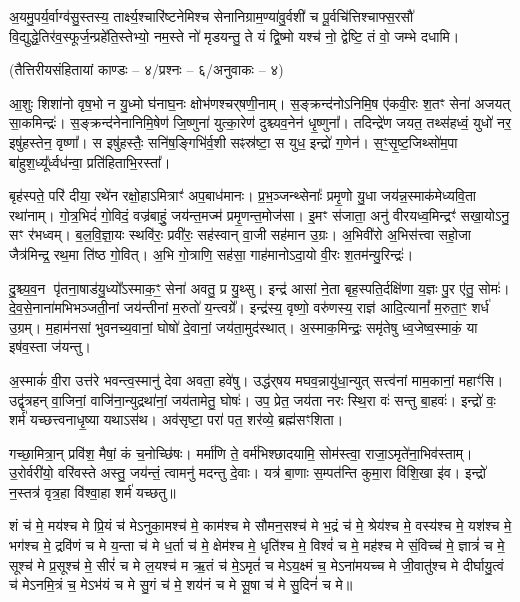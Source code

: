 अ॒यमु॒पर्य॒र्वाग्व॑सु॒स्तस्य॒ तार्क्ष्य॒श्चारि॑ष्टनेमिश्च  सेनानि\-ग्राम॒ण्या॑वु॒र्वशी॑ च
पू॒र्वचि॑त्तिश्चाफ्स॒रसौ॑ वि॒द्युद्धे॒तिर॑व॒\-स्फूर्ज॒न्प्रहे॑ति॒स्तेभ्यो॒
नम॒स्ते नो॑ मृडयन्तु॒ ते यं द्वि॒ष्मो यश्च॑ नो॒ द्वेष्टि॒ तं वो॒  जम्भे दधामि।


\centerline{\normalsize (तैत्तिरीयसंहितायां काण्डः – ४/प्रश्नः – ६/अनुवाकः – ४)}

आ॒शुः शिशा॑नो वृष॒भो न यु॒ध्मो घ॑नाघ॒नः क्षोभ॑णश्चर्‌षणी॒नाम्। स॒ङ्क्रन्द॑नोऽनिमि॒ष ए॑कवी॒रः श॒तꣳ सेना॑ अजयत् सा॒कमिन्द्रः॑। स॒ङ्क्रन्द॑नेनानिमि॒षेण॑ जि॒ष्णुना॑ युत्का॒रेण॑ दुश्च्यव॒नेन॑ धृ॒ष्णुना᳚। तदिन्द्रे॑ण जयत॒ तथ्स॑हध्वं॒ युधो॑ नर॒ इषु॑हस्तेन॒ वृष्णा᳚। स इषु॑हस्तैः॒ सनि॑ष॒ङ्गिभि॑र्व॒शी सꣴस्र॑ष्टा॒ स युध॒ इन्द्रो॑ ग॒णेन॑। स॒ꣳ॒सृ॒ष्ट॒जिथ्सो॑म॒पा बा॑हुश॒ध्यू᳚र्ध्वध॑न्वा॒ प्रति॑हिताभि॒रस्ता᳚।

बृह॑स्पते॒ परि॑ दीया॒ रथे॑न रक्षो॒हाऽमित्राꣳ॑ अप॒बाध॑मानः। प्र॒भ॒ञ्जन्थ्सेनाः᳚ प्रमृ॒णो यु॒धा जय॑न्न॒स्माक॑मेध्यवि॒ता रथा॑नाम्। गो॒त्र॒भिदं॑ गो॒विदं॒ वज्र॑बाहुं॒ जय॑न्त॒मज्म॑ प्रमृ॒णन्त॒मोज॑सा। इ॒मꣳ स॑जाता॒ अनु॑ वीरयध्व॒मिन्द्रꣳ॑ सखा॒योऽनु॒ सꣳ र॑भध्वम्। ब॒ल॒वि॒ज्ञा॒यः स्थवि॑रः॒ प्रवी॑रः॒ सह॑स्वान् वा॒जी सह॑मान उ॒ग्रः। अ॒भिवी॑रो अ॒भिस॑त्त्वा सहो॒जा जैत्र॑मिन्द्र॒ रथ॒मा ति॑ष्ठ गो॒वित्। अ॒भि गो॒त्राणि॒ सह॑सा॒ गाह॑मानोऽदा॒यो वी॒रः श॒तम॑न्यु॒रिन्द्रः॑।

दु॒श्च्य॒व॒न पृ॑तना॒षाड॑यु॒ध्यो᳚ऽस्माक॒ꣳ॒ सेना॑ अवतु॒ प्र यु॒थ्सु। इन्द्र॑ आसां ने॒ता बृह॒स्पति॒र्दक्षि॑णा य॒ज्ञः पु॒र ए॑तु॒ सोमः॑। दे॒व॒से॒नाना॑मभिभञ्जती॒नां जय॑न्तीनां म॒रुतो॑ य॒न्त्वग्रे᳚। इन्द्र॑स्य॒ वृष्णो॒ वरु॑णस्य॒ राज्ञ॑ आदि॒त्यानां᳚ म॒रुता॒ꣳ॒ शर्ध॑ उ॒ग्रम्। म॒हाम॑नसां भुवनच्य॒वानां॒ घोषो॑ दे॒वानां॒ जय॑ता॒मुद॑स्थात्। अ॒स्माक॒मिन्द्रः॒ समृ॑तेषु ध्व॒जेष्व॒स्माकं॒ या इष॑व॒स्ता ज॑यन्तु।

अ॒स्माकं॑ वी॒रा उत्त॑रे भवन्त्व॒स्मानु॑ देवा अवता॒ हवे॑षु। उद्ध॑र्‌षय मघव॒न्नायु॑धा॒न्युत् सत्त्व॑नां माम॒कानां॒ महाꣳ॑सि। उद्वृ॑त्रहन् वा॒जिनां॒ वाजि॑ना॒न्युद्रथा॑नां॒ जय॑तामेतु॒ घोषः॑। उप॒ प्रेत॒ जय॑ता नरः स्थि॒रा वः॑ सन्तु बा॒हवः॑। इन्द्रो॑ वः॒ शर्म॑ यच्छत्त्वनाधृ॒ष्या यथाऽस॑थ। अव॑सृष्टा॒ परा॑ पत॒ शर॑व्ये॒ ब्रह्म॑सꣳशिता।

गच्छा॒मित्रा॒न् प्रवि॑श॒ मैषां॒ कं च॒नोच्छि॑षः। मर्मा॑णि ते॒ वर्म॑भिश्छादयामि॒ सोम॑स्त्वा॒ राजा॒ऽमृते॑ना॒भिव॑स्ताम्। उ॒रोर्वरी॑यो॒ वरि॑वस्ते अस्तु॒ जय॑न्तं॒ त्वामनु॑ मदन्तु दे॒वाः। यत्र॑ बा॒णाः स॒म्पत॑न्ति कुमा॒रा वि॑शि॒खा इ॑व। इन्द्रो॑ न॒स्तत्र॑ वृत्र॒हा वि॑श्वा॒हा शर्म॑ यच्छतु॥

शं च॑ मे॒ मय॑श्च मे प्रि॒यं च॑ मेऽनुका॒मश्च॑ मे॒ काम॑श्च मे सौमन॒सश्च॑ मे भ॒द्रं च॑ मे॒ श्रेय॑श्च मे॒ वस्य॑श्च मे॒ यश॑श्च मे॒ भग॑श्च मे॒ द्रवि॑णं च मे य॒न्ता च॑ मे ध॒र्ता च॑ मे॒ क्षेम॑श्च मे॒ धृति॑श्च मे॒ विश्वं॑ च मे॒ मह॑श्च मे सं॒विच्च॑ मे॒ ज्ञात्रं॑ च मे॒ सूश्च॑ मे प्र॒सूश्च॑ मे॒ सीरं॑ च मे ल॒यश्च॑ म ऋ॒तं च॑ मे॒ऽमृतं॑ च मेऽय॒क्ष्मं च॒ मेऽना॑मयच्च मे जी॒वातु॑श्च मे दीर्घायु॒त्वं च॑ मेऽनमि॒त्रं च॒ मेऽभ॑यं च मे सु॒गं च॑ मे॒ शय॑नं च मे सू॒षा च॑ मे सु॒दिनं॑ च मे॥

